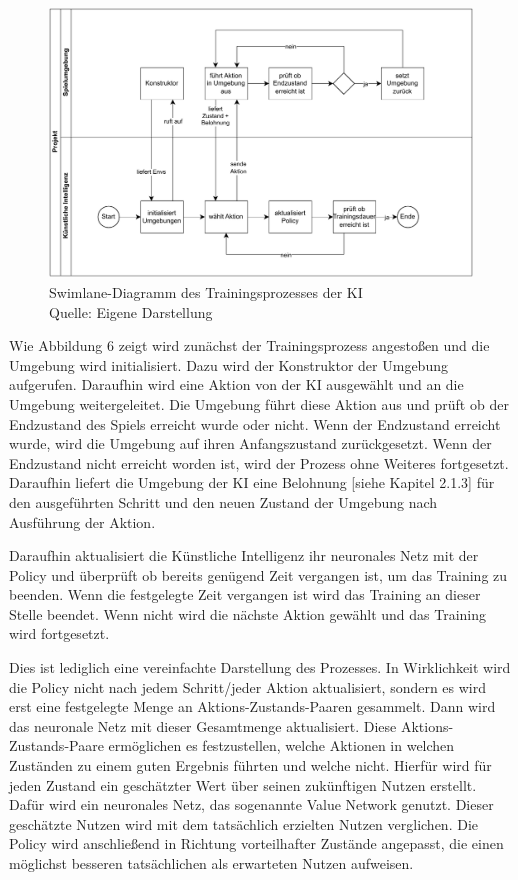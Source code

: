 \nopagebreak
\begin{figure}[H]
	\includegraphics[width=1\textwidth]{Bilder/swimlane.drawio.pdf} 
	\caption[Swimlane-Diagramm des Trainingsprozesses der KI]{Swimlane-Diagramm des Trainingsprozesses der KI\\ Quelle: Eigene Darstellung}
\end{figure}	

Wie Abbildung 6 zeigt wird zunächst der Trainingsprozess angestoßen und die Umgebung wird initialisiert. Dazu wird der Konstruktor der Umgebung aufgerufen. Daraufhin wird eine Aktion von der KI ausgewählt und an die Umgebung weitergeleitet. Die Umgebung führt diese Aktion aus und prüft ob der Endzustand des Spiels erreicht wurde oder nicht. Wenn der Endzustand erreicht wurde, wird die Umgebung auf ihren Anfangszustand zurückgesetzt. Wenn der Endzustand nicht erreicht worden ist, wird der Prozess ohne Weiteres fortgesetzt. Daraufhin liefert die Umgebung der KI eine Belohnung [siehe Kapitel 2.1.3] für den ausgeführten Schritt und den neuen Zustand der Umgebung nach Ausführung der Aktion.

Daraufhin aktualisiert die Künstliche Intelligenz ihr neuronales Netz mit der Policy und überprüft ob bereits genügend Zeit vergangen ist, um das Training zu beenden. Wenn die festgelegte Zeit vergangen ist wird das Training an dieser Stelle beendet. Wenn nicht wird die nächste Aktion gewählt und das Training wird fortgesetzt.

Dies ist lediglich eine vereinfachte Darstellung des Prozesses. In Wirklichkeit wird die Policy nicht nach jedem Schritt/jeder Aktion aktualisiert, sondern es wird erst eine festgelegte Menge an Aktions-Zustands-Paaren gesammelt. Dann wird das neuronale Netz mit dieser Gesamtmenge aktualisiert. Diese Aktions-Zustands-Paare ermöglichen es festzustellen, welche Aktionen in welchen Zuständen zu einem guten Ergebnis führten und welche nicht. Hierfür wird für jeden Zustand ein geschätzter Wert über seinen zukünftigen Nutzen erstellt. Dafür wird ein neuronales Netz, das sogenannte Value Network genutzt. Dieser geschätzte Nutzen wird mit dem tatsächlich erzielten Nutzen verglichen. Die Policy wird anschließend in Richtung vorteilhafter Zustände angepasst, die einen möglichst besseren tatsächlichen als erwarteten Nutzen aufweisen.
